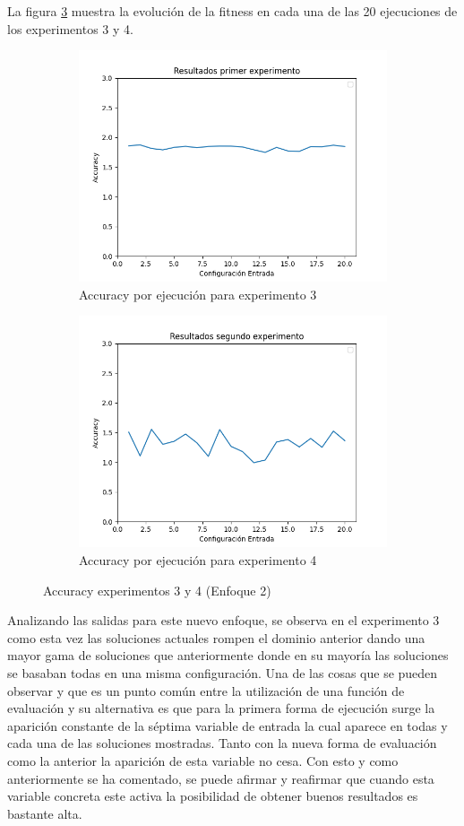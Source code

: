 La figura \ref{fig:fitness_exp3_exp4} muestra la evolución de la fitness en cada una de las 20 ejecuciones de los experimentos 3 y 4.



\begin{figure}[h!] 
\begin{subfigure}[b]{0.60\linewidth}
\includegraphics[width=.7\linewidth]{images/resultSecondEval.png}
\caption{Accuracy por ejecución para experimento 3}
\label{fig:westminster_lateral}
\end{subfigure}
\begin{subfigure}[b]{0.60\linewidth}
 \includegraphics[width=.7\linewidth]{images/resultFourthEval.png}
\caption{Accuracy por ejecución para experimento 4}
\label{fig:accuracy_experiment4_duplicate}
\end{subfigure}
\caption{Accuracy experimentos 3 y 4 (Enfoque 2)}
\label{fig:fitness_exp3_exp4}
\end{figure}



Analizando las salidas para este nuevo enfoque, se observa en el experimento 3 como esta vez las soluciones actuales rompen el dominio anterior dando una mayor gama de soluciones que anteriormente donde en su mayoría las soluciones se basaban todas en una misma configuración. Una de las cosas que se pueden observar y que es un punto común entre la utilización de una función de evaluación y su alternativa es que para la primera forma de ejecución surge la aparición constante de la séptima variable de entrada la cual aparece en todas y cada una de las soluciones mostradas. Tanto con la nueva forma de evaluación como la anterior la aparición de esta variable no cesa. Con esto y como anteriormente se ha comentado, se puede afirmar y reafirmar que cuando esta variable concreta este activa la posibilidad de obtener buenos resultados es bastante alta.

